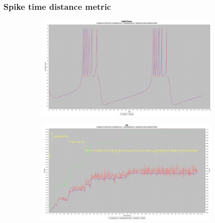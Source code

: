 \documentclass[10pt]{article}
\begin{document}
		\subsubsection{Spike time distance metric}
			\begin{figure}[H]
				\centering
					\begin{subfigure}{.5\textwidth}
						\centering
						\includegraphics[width=\linewidth]{./../images/izzy3/time/plot.png}
						
						\label{fig:sub7a}
					\end{subfigure}%
					\begin{subfigure}{.5\textwidth}
						\centering
						\includegraphics[width=\linewidth]{./../images/izzy3/time/prog.png}
						
						\label{fig:sub7b}
					\end{subfigure}
					
					\label{fig:plot7}
			\end{figure}
			
\end{document}
